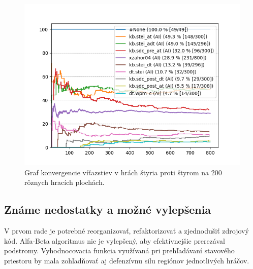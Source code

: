 \documentclass[pdftex, 11pt, a4paper, titlepage]{article}
\begin{document}
    \begin{figure}[h]
        \centering
        \includegraphics[scale=0.85]{tournament_plot.png}
        \caption{Graf konvergencie víťazstiev v hrách štyria proti štyrom na 200 rôznych hracích plochách.}
        \label{obr:graf}
    \end{figure}

    \subsection{Známe nedostatky a možné vylepšenia}
    V prvom rade je potrebné reorganizovať, refaktorizovať a zjednodušiť zdrojový kód. Alfa-Beta algoritmus nie je vylepšený, aby efektívnejšie prerezával podstromy.
    Vyhodnocovacia funkcia využívaná pri prehľadávaní stavového priestoru by mala zohľadňovať aj defenzívnu silu regiónov jednotlivých hráčov.
\end{document}
